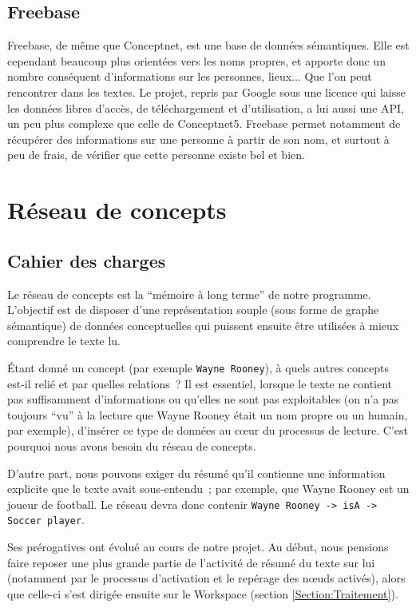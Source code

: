 \documentclass[a4paper, 12pt]{article}
\begin{document}
\subsection{Freebase}\label{Subsection:Freebase}

Freebase, de même que Conceptnet, est une base de données sémantiques. Elle est cependant beaucoup plus orientées vers les noms propres, et apporte donc un nombre conséquent d'informations sur les personnes, lieux... Que l'on peut rencontrer dans les textes. Le projet, repris par Google sous une licence qui laisse les données libres d'accès, de téléchargement et d'utilisation, a lui aussi une API, un peu plus complexe que celle de Conceptnet5. Freebase permet notamment de récupérer des informations sur une personne à partir de son nom, et surtout à peu de frais, de vérifier que cette personne existe bel et bien.

\section{Réseau de concepts}\label{Section:RC}


\subsection{Cahier des charges}

Le réseau de concepts est la ``mémoire à long terme'' de notre programme. L'objectif est de disposer d'une représentation souple (sous forme de graphe sémantique) de données conceptuelles qui puissent ensuite être utilisées à mieux comprendre le texte lu.

Étant donné un concept (par exemple \verb|Wayne Rooney|), à quels autres concepts est-il relié et par quelles relations~? Il est essentiel, lorsque le texte ne contient pas suffisamment d'informations ou qu'elles ne sont pas exploitables (on n'a pas toujours ``vu'' à la lecture que Wayne Rooney était un nom propre ou un humain, par exemple), d'insérer ce type de données au cœur du processus de lecture. C'est pourquoi nous avons besoin du réseau de concepts.

D'autre part, nous pouvons exiger du résumé qu'il contienne une information explicite que le texte avait sous-entendu~; par exemple, que Wayne Rooney est un joueur de football. Le réseau devra donc contenir \verb|Wayne Rooney -> isA -> Soccer player|.

Ses prérogatives ont évolué au cours de notre projet. Au début, nous pensions faire reposer une plus grande partie de l'activité de résumé du texte sur lui (notamment par le processus d'activation et le repérage des nœuds activés), alors que celle-ci s'est dirigée ensuite sur le Workspace (section \ref{Section:Traitement}).
\end{document}
